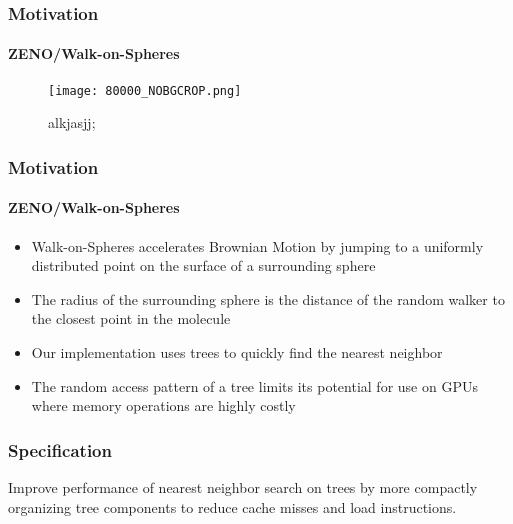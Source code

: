 

\begin{frame}
  \frametitle{Motivation}
  \framesubtitle{ZENO/Walk-on-Spheres}

  \begin{figure}
    \centering
    \texttt{[image: 80000\_NOBGCROP.png]}
    \caption{alkjasjj;}
    \label{fig:80000}
  \end{figure}

\end{frame}

\begin{frame}
  \frametitle{Motivation}
  \framesubtitle{ZENO/Walk-on-Spheres}

  \begin{itemize}
    \item Walk-on-Spheres accelerates Brownian Motion by jumping to a uniformly distributed point on the surface
      of a surrounding sphere
    \item The radius of the surrounding sphere is the distance of the random walker to the closest point in
      the molecule
    \item Our implementation uses \kd trees to quickly find the nearest neighbor
    \item The random access pattern of a \kd tree limits its potential for use on GPUs where memory operations
      are highly costly
  \end{itemize}

\end{frame}

\begin{frame}
  \frametitle{Specification}

  Improve performance of nearest neighbor search on \kd trees by more compactly organizing tree components
  to reduce cache misses and load instructions.

\end{frame}
